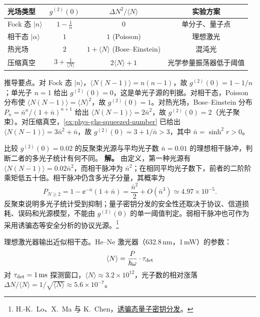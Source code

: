 \begin{center}
\begin{tabular}{lccc}
\hline
光场类型 & \(g^{(2)}(0)\) & \(\Delta N^2/\langle N\rangle\) & 实验方案 \\
\hline
Fock 态 \(|n\rangle\) & \(1-\frac{1}{n}\) & \(0\) & 单分子、量子点 \\
相干态 \(|\alpha\rangle\) & \(1\) & \(1\) (Poisson) & 理想激光 \\
热光场 & \(2\) & \(1+\langle N\rangle\) (Bose--Einstein) & 混沌光 \\
压缩真空 & \(3+\frac{1}{\langle N\rangle}\) & \(2\langle N\rangle+1\) & 光学参量振荡器低于阈值 \\
\hline
\end{tabular}
\end{center}

推导要点。对 Fock 态 \(|n\rangle\)，\(\langle N(N-1)\rangle=n(n-1)\)，故 \(g^{(2)}(0)=1-1/n\)；单光子 \(n=1\) 给出 \(g^{(2)}(0)=0\)，这是单光子源的判据。对相干态，Poisson 分布使 \(\langle N(N-1)\rangle=\langle N\rangle^2\)，故 \(g^{(2)}(0)=1\)。对热光场，Bose--Einstein 分布 \(P_n=\bar n^n/(1+\bar n)^{n+1}\) 给出 \(\langle N(N-1)\rangle=2\bar n^2\)，故 \(g^{(2)}(0)=2\)（光子聚束）。对压缩真空，\cref{ex:phys-ghs-squeezed-number} 已给出 \(\langle N(N-1)\rangle=3\bar n^2+\bar n\)，故 \(g^{(2)}(0)=3+1/\bar n>3\)，其中 \(\bar n=\sinh^2r>0\)。

\begin{exbox}[单光子源的 \(g^{(2)}(0)\) 测量]
比较 $g^{(2)}(0)=0.02$ 的反聚束光源与平均光子数 $\bar n=0.01$ 的理想相干脉冲，判断二者的多光子统计有何不同。
\textbf{解。} 由定义，第一种光源有 $\langle N(N-1)\rangle=0.02\bar n^2$，而相干脉冲为 $\bar n^2$；在相同平均光子数下，前者的二阶阶乘矩低五十倍。相干脉冲仍含多光子分量，其概率为
\[
 P_{N\ge2}=1-\ee^{-\bar n}(1+\bar n)
 =\frac{\bar n^2}{2}+O(\bar n^3)\simeq4.97\times10^{-5}.
\]
反聚束说明多光子统计受到抑制；量子密钥分发的安全性还取决于协议、信道损耗、误码和光源模型，不能由 $g^{(2)}(0)$ 的单一阈值判定。弱相干脉冲也可作为采用诱骗态等安全分析的协议光源。\footnote{H.-K.~Lo、X.~Ma 与 K.~Chen，\href{https://arxiv.org/abs/quant-ph/0411004}{诱骗态量子密钥分发}。}
\end{exbox}

理想激光器输出近似相干态。He--Ne 激光器（632.8\,nm，1\,mW）的参数：
\[
\langle N\rangle=\frac{P}{\hbar\omega}\cdot\tau_{\rm det}
\]
对 \(\tau_{\rm det}=1\,\mathrm{ms}\) 探测窗口，\(\langle N\rangle\approx3.2\times10^{12}\)，光子数的相对涨落 \(\Delta N/\langle N\rangle=1/\sqrt{\langle N\rangle}\approx5.6\times10^{-7}\)。

